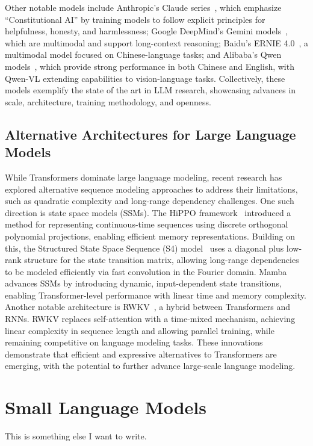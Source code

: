 Other notable models include Anthropic's Claude series~\citep{anthropic2024claude3,anthropic2024claude35,anthropic2025claude37}, which emphasize “Constitutional AI” by training models to follow explicit principles for helpfulness, honesty, and harmlessness; Google DeepMind's Gemini models~\citep{deepmind2023gemini}, which are multimodal and support long-context reasoning; Baidu's ERNIE 4.0~\citep{baidu2023ernie4}, a multimodal model focused on Chinese-language tasks; and Alibaba's Qwen models~\citep{alibaba2023qwen}, which provide strong performance in both Chinese and English, with Qwen-VL extending capabilities to vision-language tasks. Collectively, these models exemplify the state of the art in LLM research, showcasing advances in scale, architecture, training methodology, and openness.


\subsection{Alternative Architectures for Large Language Models}
While Transformers dominate large language modeling, recent research has explored alternative sequence modeling approaches to address their limitations, such as quadratic complexity and long-range dependency challenges. One such direction is state space models (SSMs). The HiPPO framework~\citep{gu2020hippo} introduced a method for representing continuous-time sequences using discrete orthogonal polynomial projections, enabling efficient memory representations. Building on this, the Structured State Space Sequence (S4) model~\citep{gu2021efficiently} uses a diagonal plus low-rank structure for the state transition matrix, allowing long-range dependencies to be modeled efficiently via fast convolution in the Fourier domain.
Mamba~\citep{gu2023mamba} advances SSMs by introducing dynamic, input-dependent state transitions, enabling Transformer-level performance with linear time and memory complexity. Another notable architecture is RWKV~\citep{peng2023rwkv}, a hybrid between Transformers and RNNs. RWKV replaces self-attention with a time-mixed mechanism, achieving linear complexity in sequence length and allowing parallel training, while remaining competitive on language modeling tasks.
These innovations demonstrate that efficient and expressive alternatives to Transformers are emerging, with the potential to further advance large-scale language modeling.


\section{Small Language Models}

This is something else I want to write.






